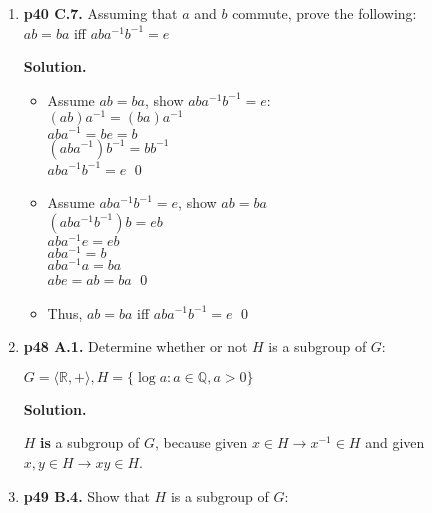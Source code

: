 \documentclass[11pt]{article}
\begin{document}
\begin{enumerate}
  Thus we know there exists $z \in G$, where $z = x^{-1}y$, such that $y = xz$. \qed \\

\item {\bfseries p40 C.7.} Assuming that $a$ and $b$ commute, prove the following: \\
  $ab = ba$ iff $aba^{-1}b^{-1} = e$
  
  {\bfseries Solution.}
  
  \begin{itemize}
  
	  \item Assume $ab = ba$, show $aba^{-1}b^{-1} = e$: \\
	  $(ab)a^{-1} = (ba)a^{-1}$ \\
	  $aba^{-1} = be = b$ \\
	  $(aba^{-1})b^{-1} = bb^{-1}$ \\
	  $aba^{-1}b^{-1} = e$ \qed \\
	  
	  
	  \item Assume $aba^{-1}b^{-1} = e$, show $ab = ba$ \\
	  $(aba^{-1}b^{-1})b = eb$ \\
	  $aba^{-1}e = eb$ \\
	  $aba^{-1} = b$ \\
	  $aba^{-1}a = ba$ \\
	  $abe = ab = ba$ \qed \\
	  
	  \item Thus, $ab = ba$ iff $aba^{-1}b^{-1} = e$ \qed
  
  \end{itemize}
  
\newpage
 
\item {\bfseries p48 A.1.} Determine whether or not $H$ is a subgroup of $G$:
  
  $G = \langle \mathbb{R},+\rangle, H = \{\log a : a \in \mathbb{Q}, a>0\}$
  
  {\bfseries Solution.}
  
  $H$ {\bfseries is} a subgroup of $G$, because given $x \in H \rightarrow x^{-1} \in H$ and given $x,y \in H \rightarrow xy \in H$. \\

\item {\bfseries p49 B.4.} Show that $H$ is a subgroup of $G$:
  

\end{enumerate}
\end{document}
